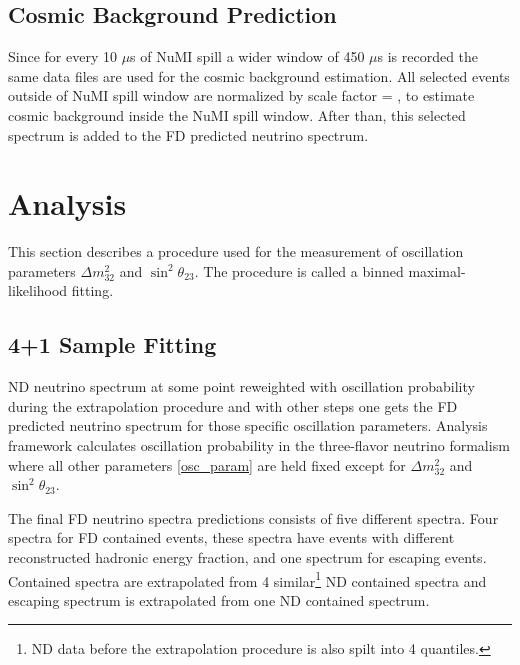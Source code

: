 \subsection{Cosmic Background Prediction}
Since for every 10 $\mu$s of NuMI spill a wider window of 450 $\mu$s is recorded the same data files
are used for the cosmic background estimation. All selected events outside of NuMI spill window are 
normalized by scale factor 
\be
{} = ,
\ee
to estimate cosmic background inside the NuMI spill window. After than, this selected spectrum is added 
to the FD predicted neutrino spectrum.

\section{Analysis}
This section describes a procedure used for the measurement of oscillation parameters $\Delta m^2_{32}$ 
and $\sin^2\theta_{23}$. The procedure is called a binned maximal-likelihood fitting.

\subsection{4+1 Sample Fitting}
ND neutrino spectrum at some point reweighted with oscillation probability during the extrapolation procedure 
and with other steps one gets the FD predicted neutrino spectrum for those specific oscillation parameters. 
Analysis framework calculates oscillation probability in the three-flavor neutrino formalism where all other
parameters \ref{osc_param} are held fixed except for $\Delta m^2_{32}$ and $\sin^2\theta_{23}$. 

The final FD neutrino spectra predictions consists of five different spectra. Four spectra for FD contained
events, these spectra have events with different reconstructed hadronic energy fraction, and one spectrum
for escaping events. Contained spectra are extrapolated from 4 similar\footnote{ND data before the extrapolation
procedure is also spilt into 4 quantiles.} ND contained spectra and escaping spectrum is extrapolated from 
one ND contained spectrum.

